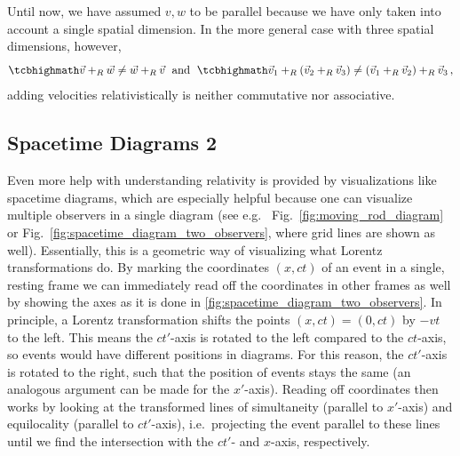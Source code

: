 \documentclass[../relativity_main.tex]{subfiles}
\begin{document}
Until now, we have assumed $v, w$ to be parallel because we have only taken into account a single spatial dimension. In the more general case with three spatial dimensions, however,
\begin{equation}
	\eqbox{
	\vec{v} +_R \vec{w} \neq \vec{w} +_R \vec{v}
	} \; \text{ and } \;
	\eqbox{
	\vec{v}_1 +_R (\vec{v}_2 +_R \vec{v}_3) \neq (\vec{v}_1 +_R \vec{v}_2) +_R \vec{v}_3
	} \, ,
\end{equation}
adding velocities relativistically is neither commutative nor associative.









		\subsection{Spacetime Diagrams 2}
Even more help with understanding relativity is provided by visualizations like spacetime diagrams, which are especially helpful because one can visualize multiple observers in a single diagram (see e.g.~ Fig.~\ref{fig:moving_rod_diagram} or  Fig.~\ref{fig:spacetime_diagram_two_observers}, where grid lines are shown as well). Essentially, this is a geometric way of visualizing what Lorentz transformations do. By marking the coordinates $(x, ct)$ of an event in a single, resting frame we can immediately read off the coordinates in other frames as well by showing the axes as it is done in \ref{fig:spacetime_diagram_two_observers}. In principle, a Lorentz transformation shifts the points $(x, ct) = (0, ct)$ by $-vt$ to the left. This means the $ct'$-axis is rotated to the left compared to the $ct$-axis, so events would have different positions in diagrams. For this reason, the $ct'$-axis is rotated to the right, such that the position of events stays the same (an analogous argument can be made for the $x'$-axis). Reading off coordinates then works by looking at the transformed lines of simultaneity (parallel to $x'$-axis) and equilocality (parallel to $ct'$-axis), i.e.~projecting the event parallel to these lines until we find the intersection with the $ct'$- and $x$-axis, respectively.


\end{document}
